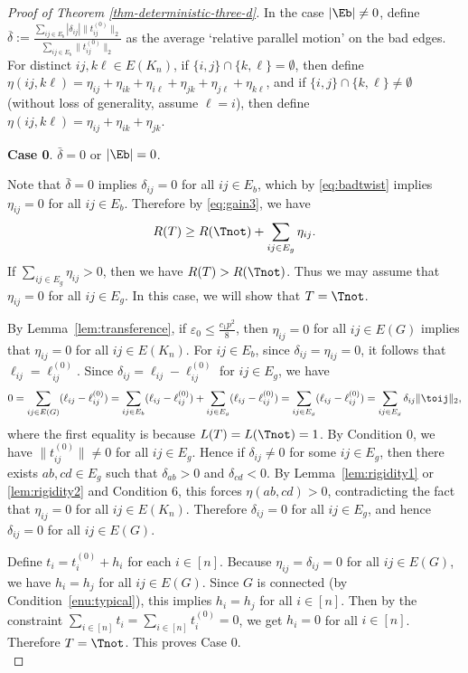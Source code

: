 \begin{proof}[Proof of Theorem \ref{thm-deterministic-three-d}]
In the case $|\Eb| \neq 0$,  define $\overline{\delta}:=\frac{\sum_{ij\in E_{b}}|\delta_{ij}|\|t_{ij}^{(0)}\|_2}{\sum_{ij\in E_{b}}\|t_{ij}^{(0)}\|_2}$
as the average `relative parallel motion' on the bad edges. 
For distinct $ij,k\ell\in E(K_{n})$, if $\{i,j\}\cap\{k,\ell\}=\emptyset$,
then define $\eta(ij,k\ell)=\eta_{ij}+\eta_{ik}+\eta_{i\ell}+\eta_{jk}+\eta_{j\ell}+\eta_{k\ell}$,
and if $\{i,j\}\cap\{k,\ell\}\neq\emptyset$ (without loss of generality,
assume $\ell=i$), then define $\eta(ij,k\ell)=\eta_{ij}+\eta_{ik}+\eta_{jk}$. 

\medskip{}

\noindent \textbf{Case 0}. $\bar{\delta} = 0$ or $|\Eb| = 0$.
\medskip

Note that $\bar{\delta}=0$ implies $\delta_{ij} =0$ for all $ij \in E_b$, which by \eqref{eq:badtwist} implies
$\eta_{ij} =0$ for all $ij \in E_b$.  Therefore by \eqref{eq:gain3}, we have
\[
	R(T) \geq R(\Tnot) + \sum_{ij \in E_g} \eta_{ij}.
\]
If $\sum_{ij \in E_g} \eta_{ij} > 0$, then we have $R(T) > R(\Tnot)$. Thus 
we may assume that $\eta_{ij} = 0$ for all $ij \in E_g$. In this case, we will show that $T = \Tnot$.

By Lemma~\ref{lem:transference}, if $\varepsilon_0 \le \frac{c_1p^2}{8}$, then
$\eta_{ij}=0$ for all $ij \in E(G)$ implies that
$\eta_{ij} = 0$ for all $ij \in E(K_n)$. 
For $ij \in E_b$, since $\delta_{ij} = \eta_{ij} = 0$, it follows that $\ell_{ij} = \ell_{ij}^{(0)}$.
Since $\delta_{ij} = \ell_{ij} - \ell_{ij}^{(0)}$ for $ij \in E_g$, we have
\[
	0 = \sum_{ij \in E(G)} (\ell_{ij} - \ell_{ij}^{(0)})
	= \sum_{ij \in E_b} (\ell_{ij} - \ell_{ij}^{(0)}) + \sum_{ij \in E_g} (\ell_{ij} - \ell_{ij}^{(0)})
	= \sum_{ij \in E_g} (\ell_{ij} - \ell_{ij}^{(0)})
	= \sum_{ij \in E_g} \delta_{ij}\|\toij\|_2,
\] 
where the first equality is because $L(T) = L(\Tnot) = 1$.
By Condition 0, we have $\|t_{ij}^{(0)}\| \neq 0$ for all $ij \in E_g$.
Hence if $\delta_{ij} \neq 0$ for some $ij \in E_g$, then there exists $ab, cd \in E_g$ 
such that $\delta_{ab} > 0$ and $\delta_{cd} < 0$. 
By Lemma~\ref{lem:rigidity1} or \ref{lem:rigidity2} and Condition 6, 
this forces $\eta(ab,cd) > 0$, contradicting the fact that
$\eta_{ij} = 0$ for all $ij \in E(K_n)$. Therefore $\delta_{ij} = 0$ for all $ij \in E_g$, and hence
$\delta_{ij} = 0$ for all $ij \in E(G)$. 

Define $t_i = t_i^{(0)} + h_i$ for each $i \in [n]$. 
Because $\eta_{ij} = \delta_{ij} = 0$ for all $ij \in E(G)$, we have $h_i = h_j$ 
for all $ij \in E(G)$. Since $G$ is connected (by Condition~\ref{enu:typical}), this implies $h_i = h_j$ for all 
$i \in [n]$. Then by the constraint $\sum_{i \in [n]} t_i = \sum_{i \in [n]} t_i^{(0)} = 0$, 
we get $h_i = 0$ for all $i \in [n]$. Therefore $T = \Tnot$.
This proves Case 0. \\


\end{proof}
